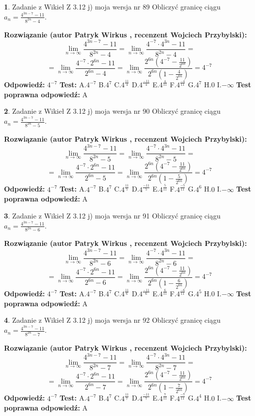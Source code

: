\documentclass[12pt, a4paper]{article}
\theoremstyle{definition} %
\newtheorem{zad}{}
\newcommand{\zadStart}[1]{\begin{zad}#1\newline}
\newcommand{\zadStop}{\end{zad}}
\newcommand{\rozwStart}[2]{\noindent \textbf{Rozwiązanie (autor #1 , recenzent #2): }\newline}
\newcommand{\rozwStop}{\newline}
\newcommand{\odpStart}{\noindent \textbf{Odpowiedź:}\newline}
\newcommand{\odpStop}{\newline}
\newcommand{\testStart}{\noindent \textbf{Test:}\newline}
\newcommand{\testStop}{\newline}
\newcommand{\kluczStart}{\noindent \textbf{Test poprawna odpowiedź:}\newline}
\newcommand{\kluczStop}{\newline}
\begin{document}
\zadStart{Zadanie z Wikieł Z 3.12 j) moja wersja nr 89}
Obliczyć granicę ciągu $a_{n}=\frac{4^{3n-7}-11}{8^{2n}-4}$.
\zadStop
\rozwStart{Patryk Wirkus}{Wojciech Przybylski}
$$\lim\limits_{n\to\infty}\frac{4^{3n-7}-11}{8^{2n}-4}= \lim\limits_{n\to\infty}\frac{4^{-7} \cdot 4^{3n}-11}{8^{2n}-4}=$$
$$= \lim\limits_{n\to\infty}\frac{4^{-7} \cdot 2^{6n}-11}{2^{6n}-4}= \lim\limits_{n\to\infty}\frac{2^{6n}(4^{-7} - \frac{11}{2^{6n}})}{2^{6n}(1-\frac{4}{2^{6n}})}= 4^{-7}$$
\rozwStop
\odpStart
$4^{-7}$
\odpStop
\testStart
A.$4^{-7}$
B.$4^{7}$
C.$4^{\frac{11}{4}}$
D.$4^{\frac{-11}{4}}$
E.$4^{\frac{4}{11}}$
F.$4^{\frac{-4}{11}}$
G.$4^{7}$
H.$0$
I.$-\infty$
\testStop
\kluczStart
A
\kluczStop



\zadStart{Zadanie z Wikieł Z 3.12 j) moja wersja nr 90}
Obliczyć granicę ciągu $a_{n}=\frac{4^{3n-7}-11}{8^{2n}-5}$.
\zadStop
\rozwStart{Patryk Wirkus}{Wojciech Przybylski}
$$\lim\limits_{n\to\infty}\frac{4^{3n-7}-11}{8^{2n}-5}= \lim\limits_{n\to\infty}\frac{4^{-7} \cdot 4^{3n}-11}{8^{2n}-5}=$$
$$= \lim\limits_{n\to\infty}\frac{4^{-7} \cdot 2^{6n}-11}{2^{6n}-5}= \lim\limits_{n\to\infty}\frac{2^{6n}(4^{-7} - \frac{11}{2^{6n}})}{2^{6n}(1-\frac{5}{2^{6n}})}= 4^{-7}$$
\rozwStop
\odpStart
$4^{-7}$
\odpStop
\testStart
A.$4^{-7}$
B.$4^{7}$
C.$4^{\frac{11}{5}}$
D.$4^{\frac{-11}{5}}$
E.$4^{\frac{5}{11}}$
F.$4^{\frac{-5}{11}}$
G.$4^{6}$
H.$0$
I.$-\infty$
\testStop
\kluczStart
A
\kluczStop



\zadStart{Zadanie z Wikieł Z 3.12 j) moja wersja nr 91}
Obliczyć granicę ciągu $a_{n}=\frac{4^{3n-7}-11}{8^{2n}-6}$.
\zadStop
\rozwStart{Patryk Wirkus}{Wojciech Przybylski}
$$\lim\limits_{n\to\infty}\frac{4^{3n-7}-11}{8^{2n}-6}= \lim\limits_{n\to\infty}\frac{4^{-7} \cdot 4^{3n}-11}{8^{2n}-6}=$$
$$= \lim\limits_{n\to\infty}\frac{4^{-7} \cdot 2^{6n}-11}{2^{6n}-6}= \lim\limits_{n\to\infty}\frac{2^{6n}(4^{-7} - \frac{11}{2^{6n}})}{2^{6n}(1-\frac{6}{2^{6n}})}= 4^{-7}$$
\rozwStop
\odpStart
$4^{-7}$
\odpStop
\testStart
A.$4^{-7}$
B.$4^{7}$
C.$4^{\frac{11}{6}}$
D.$4^{\frac{-11}{6}}$
E.$4^{\frac{6}{11}}$
F.$4^{\frac{-6}{11}}$
G.$4^{5}$
H.$0$
I.$-\infty$
\testStop
\kluczStart
A
\kluczStop



\zadStart{Zadanie z Wikieł Z 3.12 j) moja wersja nr 92}
Obliczyć granicę ciągu $a_{n}=\frac{4^{3n-7}-11}{8^{2n}-7}$.
\zadStop
\rozwStart{Patryk Wirkus}{Wojciech Przybylski}
$$\lim\limits_{n\to\infty}\frac{4^{3n-7}-11}{8^{2n}-7}= \lim\limits_{n\to\infty}\frac{4^{-7} \cdot 4^{3n}-11}{8^{2n}-7}=$$
$$= \lim\limits_{n\to\infty}\frac{4^{-7} \cdot 2^{6n}-11}{2^{6n}-7}= \lim\limits_{n\to\infty}\frac{2^{6n}(4^{-7} - \frac{11}{2^{6n}})}{2^{6n}(1-\frac{7}{2^{6n}})}= 4^{-7}$$
\rozwStop
\odpStart
$4^{-7}$
\odpStop
\testStart
A.$4^{-7}$
B.$4^{7}$
C.$4^{\frac{11}{7}}$
D.$4^{\frac{-11}{7}}$
E.$4^{\frac{7}{11}}$
F.$4^{\frac{-7}{11}}$
G.$4^{4}$
H.$0$
I.$-\infty$
\testStop
\kluczStart
A
\kluczStop
\end{document}
